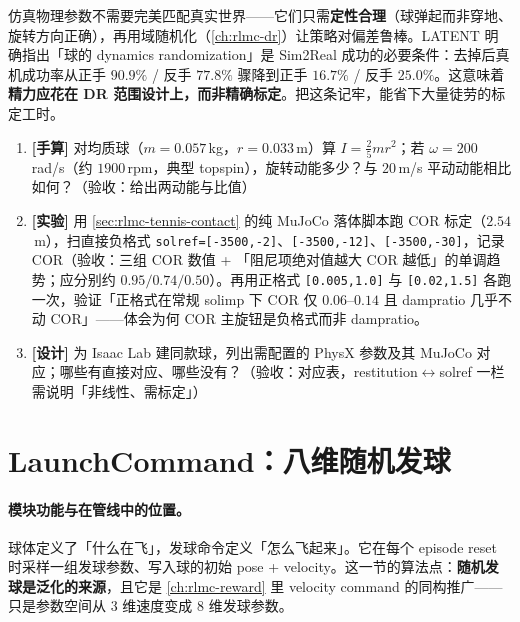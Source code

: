 \begin{insight}\label{ins:rlmc-tennis-dr}
仿真物理参数不需要完美匹配真实世界——它们只需\textbf{定性合理}（球弹起而非穿地、旋转方向正确），再用域随机化（\cref{ch:rlmc-dr}）让策略对偏差鲁棒。LATENT 明确指出「球的 dynamics randomization」是 Sim2Real 成功的必要条件：去掉后真机成功率从正手 $90.9\%$ / 反手 $77.8\%$ 骤降到正手 $16.7\%$ / 反手 $25.0\%$\cite{tennis_latent2026}。这意味着\textbf{精力应花在 DR 范围设计上，而非精确标定}。把这条记牢，能省下大量徒劳的标定工时。
\end{insight}

\begin{practice}[本节动手任务]
\begin{enumerate}
  \item \textbf{[手算]} 对均质球（$m=0.057$\,kg，$r=0.033$\,m）算 $I=\tfrac{2}{5}mr^2$；若 $\omega=200$\,rad/s（约 $1900$\,rpm，典型 topspin），旋转动能多少？与 $20$\,m/s 平动动能相比如何？（验收：给出两动能与比值）
  \item \textbf{[实验]} 用 \cref{sec:rlmc-tennis-contact} 的纯 MuJoCo 落体脚本跑 COR 标定（$2.54$\,m），扫直接负格式 \verb|solref=[-3500,-2]|、\verb|[-3500,-12]|、\verb|[-3500,-30]|，记录 COR（验收：三组 COR 数值 + 「阻尼项绝对值越大 COR 越低」的单调趋势；应分别约 $0.95/0.74/0.50$）。再用正格式 \verb|[0.005,1.0]| 与 \verb|[0.02,1.5]| 各跑一次，验证「正格式在常规 solimp 下 COR 仅 $0.06$--$0.14$ 且 dampratio 几乎不动 COR」——体会为何 COR 主旋钮是负格式而非 dampratio。
  \item \textbf{[设计]} 为 Isaac Lab 建同款球，列出需配置的 PhysX 参数及其 MuJoCo 对应；哪些有直接对应、哪些没有？（验收：对应表，restitution$\leftrightarrow$solref 一栏需说明「非线性、需标定」）
\end{enumerate}
\end{practice}

\section{LaunchCommand：八维随机发球}
\label{sec:rlmc-tennis-launch}

\paragraph{模块功能与在管线中的位置。}球体定义了「什么在飞」，发球命令定义「怎么飞起来」。它在每个 episode reset 时采样一组发球参数、写入球的初始 pose + velocity。这一节的算法点：\textbf{随机发球是泛化的来源}，且它是 \cref{ch:rlmc-reward} 里 velocity command 的同构推广——只是参数空间从 $3$ 维速度变成 $8$ 维发球参数。

